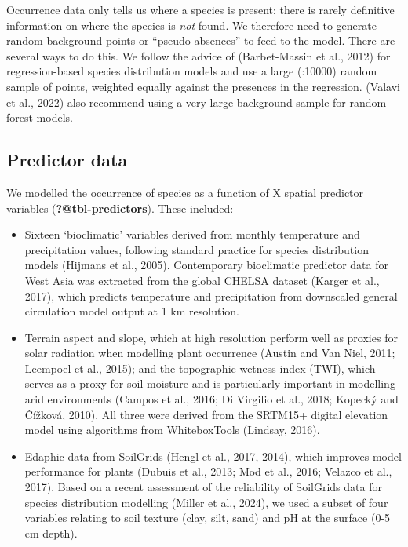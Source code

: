 \documentclass[
  number,
  review]{elsarticle}
\providecommand{\tightlist}{%
  \setlength{\itemsep}{0pt}\setlength{\parskip}{0pt}}\usepackage{longtable,booktabs,array}
\begin{document}
Occurrence data only tells us where a species is present; there is
rarely definitive information on where the species is \emph{not} found.
We therefore need to generate random background points or
``pseudo-absences'' to feed to the model. There are several ways to do
this. We follow the advice of (Barbet-Massin et al., 2012) for
regression-based species distribution models and use a large (:10000)
random sample of points, weighted equally against the presences in the
regression. (Valavi et al., 2022) also recommend using a very large
background sample for random forest models.

\subsection{Predictor data}\label{predictor-data}

We modelled the occurrence of species as a function of X spatial
predictor variables (\textbf{?@tbl-predictors}). These included:

\begin{itemize}
\tightlist
\item
  Sixteen `bioclimatic' variables derived from monthly temperature and
  precipitation values, following standard practice for species
  distribution models (Hijmans et al., 2005). Contemporary bioclimatic
  predictor data for West Asia was extracted from the global CHELSA
  dataset (Karger et al., 2017), which predicts temperature and
  precipitation from downscaled general circulation model output at 1 km
  resolution.
\end{itemize}

\begin{itemize}
\tightlist
\item
  Terrain aspect and slope, which at high resolution perform well as
  proxies for solar radiation when modelling plant occurrence (Austin
  and Van Niel, 2011; Leempoel et al., 2015); and the topographic
  wetness index (TWI), which serves as a proxy for soil moisture and is
  particularly important in modelling arid environments (Campos et al.,
  2016; Di Virgilio et al., 2018; Kopecký and Čížková, 2010). All three
  were derived from the SRTM15+ digital elevation model using algorithms
  from WhiteboxTools (Lindsay, 2016).
\end{itemize}

\begin{itemize}
\tightlist
\item
  Edaphic data from SoilGrids (Hengl et al., 2017, 2014), which improves
  model performance for plants (Dubuis et al., 2013; Mod et al., 2016;
  Velazco et al., 2017). Based on a recent assessment of the reliability
  of SoilGrids data for species distribution modelling (Miller et al.,
  2024), we used a subset of four variables relating to soil texture
  (clay, silt, sand) and pH at the surface (0-5 cm depth).
\end{itemize}
\end{document}
